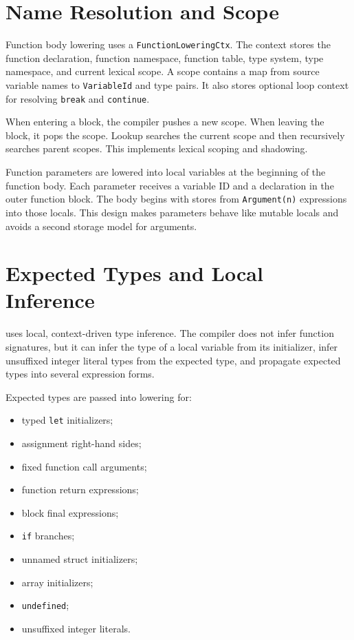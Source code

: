\section{Name Resolution and Scope}

Function body lowering uses a \texttt{FunctionLoweringCtx}. The context stores
the function declaration, function namespace, function table, type system, type
namespace, and current lexical scope. A scope contains a map from source variable
names to \texttt{VariableId} and type pairs. It also stores optional loop
context for resolving \texttt{break} and \texttt{continue}.

When entering a block, the compiler pushes a new scope. When leaving the block,
it pops the scope. Lookup searches the current scope and then recursively
searches parent scopes. This implements lexical scoping and shadowing.

Function parameters are lowered into local variables at the beginning of the
function body. Each parameter receives a variable ID and a declaration in the
outer function block. The body begins with stores from \texttt{Argument(n)}
expressions into those locals. This design makes parameters behave like mutable
locals and avoids a second storage model for arguments.

\section{Expected Types and Local Inference}

\epl{} uses local, context-driven type inference. The compiler does not infer
function signatures, but it can infer the type of a local variable from its
initializer, infer unsuffixed integer literal types from the expected type, and
propagate expected types into several expression forms.

Expected types are passed into lowering for:

\begin{itemize}
  \item typed \texttt{let} initializers;
  \item assignment right-hand sides;
  \item fixed function call arguments;
  \item function return expressions;
  \item block final expressions;
  \item \texttt{if} branches;
  \item unnamed struct initializers;
  \item array initializers;
  \item \texttt{undefined};
  \item unsuffixed integer literals.
\end{itemize}

